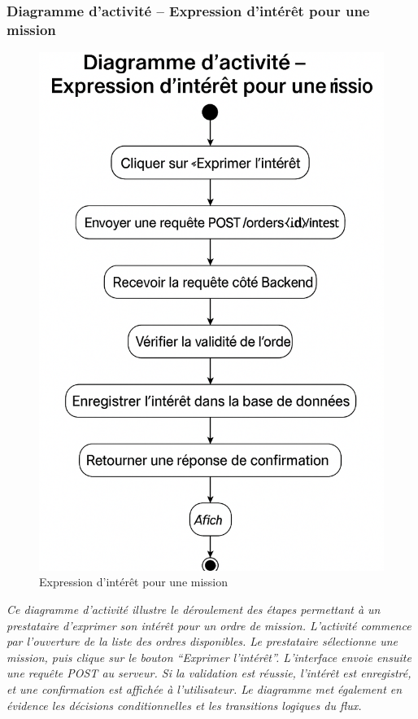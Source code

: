 \subsubsection*{Diagramme d’activité – Expression d'intérêt pour une mission}
\begin{figure}[H]
\centering
\includegraphics[width=0.85\linewidth]{figures/interet act.png}
\caption{Expression d'intérêt pour une mission}
\end{figure}

\textit{Ce diagramme d’activité illustre le déroulement des étapes permettant à un prestataire d’exprimer son intérêt pour un ordre de mission. L’activité commence par l’ouverture de la liste des ordres disponibles. Le prestataire sélectionne une mission, puis clique sur le bouton “Exprimer l’intérêt”. L’interface envoie ensuite une requête POST au serveur. Si la validation est réussie, l’intérêt est enregistré, et une confirmation est affichée à l’utilisateur. Le diagramme met également en évidence les décisions conditionnelles et les transitions logiques du flux.}

